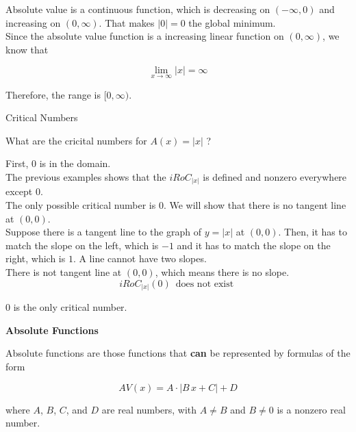 \documentclass{ximera}
\begin{document}
Absolute value is a continuous function, which is decreasing on $(-\infty, 0)$ and increasing on $(0, \infty)$. That makes $| 0 | = 0$ the global minimum. \\


Since the absolute value function is a increasing linear function on $(0, \infty)$, we know that

\[
\lim\limits_{x \to \infty}| x | = \infty
\]



Therefore, the range is $[0, \infty)$.








\begin{example}  Critical Numbers


What are the cricital numbers for $A(x) = | x |$ ?



\begin{explanation}


First, $0$ is in the domain. \\

The previous examples shows that the $iRoC_{|x|}$ is defined and nonzero everywhere except $0$. \\

The only possible critical number is $0$.  We will show that there is no tangent line at $(0,0)$. \\


Suppose there is a tangent line to the graph of $y = | x |$ at $(0,0)$.  Then, it has to match the slope on the left, which is $-1$ and it has to match the slope on the right, which is $1$.  A line cannot have two slopes. \\ 


There is not tangent line at $(0,0)$, which means there is no slope. \\



\[
iRoC_{|x|}(0) \, \text{ does not exist }
\]


$0$ is the only critical number.



\end{explanation}


\end{example}








\begin{definition} \textbf{\textcolor{green!50!black}{Absolute Functions}}

Absolute functions are those functions that \textbf{\textcolor{purple!85!blue}{can}} be represented by formulas of the form


\[      AV(x) = A \cdot | B \, x + C| + D   \]

where $A$, $B$, $C$, and $D$ are real numbers, with $A \ne B$ and $B \ne 0$ is a nonzero real number.


\end{definition}
\end{document}
